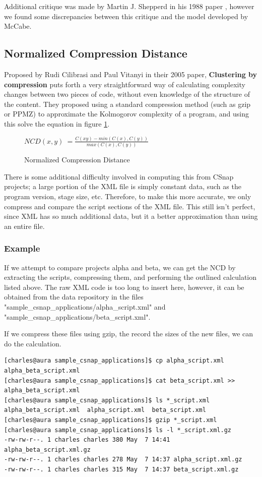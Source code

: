 \documentclass[]{article}
\begin{document}
Additional critique was made by Martin J. Shepperd in his 1988 paper \cite{shepperd1988critique}, however we found some discrepancies between this critique and the model developed by McCabe.

\subsection{Normalized Compression Distance}

Proposed by Rudi Cilibrasi and Paul Vitanyi in their 2005 paper, \textbf{Clustering by compression} \cite{ref:cilibrasi2005clustering} puts forth a very straightforward way of calculating complexity changes between two pieces of code, without even knowledge of the structure of the content.
They proposed using a standard compression method (such as gzip or PPMZ) to approximate the Kolmogorov complexity of a program, and using this solve the equation in figure \ref{ncd_eq_1}.


\begin{figure}[h]
	\caption{Normalized Compression Distance}
	\label{ncd_eq_1}
	\centering
	$NCD(x,y) ~= \frac{C(xy) - min(C(x),C(y))}{max(C(x),C(y))}$
\end{figure}

There is some additional difficulty involved in computing this from CSnap projects; a large portion of the XML file is simply constant data, such as the program version, stage size, etc.
Therefore, to make this more accurate, we only compress and compare the script sections of the XML file.
This still isn't perfect, since XML has so much additional data, but it a better approximation than using an entire file.

\subsubsection{Example}

If we attempt to compare projects alpha and beta, we can get the NCD by extracting the scripts, compressing them, and performing the outlined calculation listed above.
The raw XML code is too long to insert here, however, it can be obtained from the data repository in the files "sample\_csnap\_applications/alpha\_script.xml" and "sample\_csnap\_applications/beta\_script.xml".

If we compress these files using gzip, the record the sizes of the new files, we can do the calculation.

\begin{lstlisting}
[charles@aura sample_csnap_applications]$ cp alpha_script.xml alpha_beta_script.xml
[charles@aura sample_csnap_applications]$ cat beta_script.xml >> alpha_beta_script.xml
[charles@aura sample_csnap_applications]$ ls *_script.xml
alpha_beta_script.xml  alpha_script.xml  beta_script.xml
[charles@aura sample_csnap_applications]$ gzip *_script.xml
[charles@aura sample_csnap_applications]$ ls -l *_script.xml.gz
-rw-rw-r--. 1 charles charles 380 May  7 14:41 alpha_beta_script.xml.gz
-rw-rw-r--. 1 charles charles 278 May  7 14:37 alpha_script.xml.gz
-rw-rw-r--. 1 charles charles 315 May  7 14:37 beta_script.xml.gz

\end{lstlisting}
\end{document}
